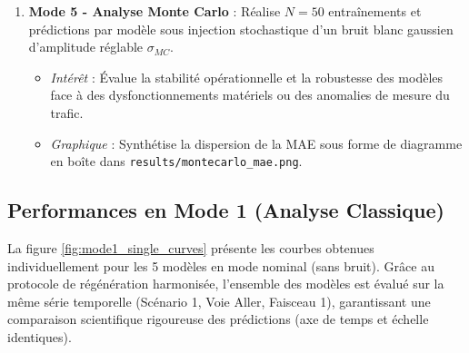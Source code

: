 \documentclass[11pt,a4paper]{article}
\begin{document}
\begin{enumerate}
    \item \textbf{Mode 5 - Analyse Monte Carlo} : Réalise $N=50$ entraînements et prédictions par modèle sous injection stochastique d'un bruit blanc gaussien d'amplitude réglable $\sigma_{MC}$.
    \begin{itemize}
        \item \textit{Intérêt} : Évalue la stabilité opérationnelle et la robustesse des modèles face à des dysfonctionnements matériels ou des anomalies de mesure du trafic.
        \item \textit{Graphique} : Synthétise la dispersion de la MAE sous forme de diagramme en boîte dans \texttt{results/montecarlo\_mae.png}.
    \end{itemize}
\end{enumerate}

\subsection{Performances en Mode 1 (Analyse Classique)}
La figure \ref{fig:mode1_single_curves} présente les courbes obtenues individuellement pour les 5 modèles en mode nominal (sans bruit). Grâce au protocole de régénération harmonisée, l'ensemble des modèles est évalué sur la même série temporelle (Scénario 1, Voie Aller, Faisceau 1), garantissant une comparaison scientifique rigoureuse des prédictions (axe de temps et échelle identiques).
\end{document}
